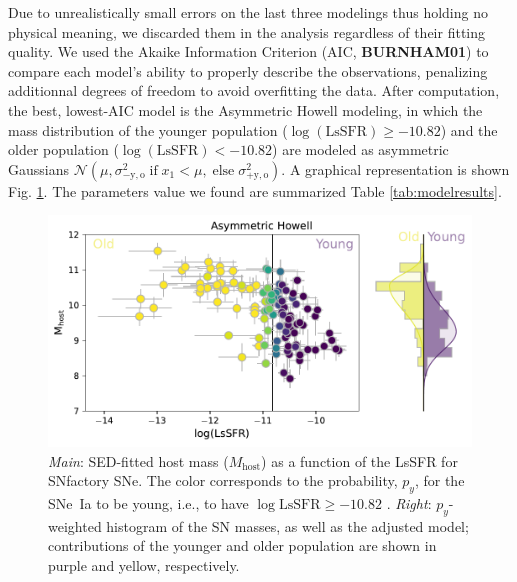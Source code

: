 \documentclass[]{aa}
\begin{document}
Due to unrealistically small errors on the last three modelings thus holding no
physical meaning, we discarded them in the analysis regardless of their fitting
quality. We used the Akaike Information Criterion (AIC, \textbf{BURNHAM01}) to
compare each model's ability to properly describe the observations, penalizing
additionnal degrees of freedom to avoid overfitting the data. After computation,
the best, lowest-AIC model is the Asymmetric Howell modeling, in which the mass
distribution of the younger population ($\log(\mathrm{LsSFR}) \geq -10.82$) and
the older population ($\log(\mathrm{LsSFR}) < -10.82$) are modeled as asymmetric
Gaussians $\mathcal{N}\left(\mu, \sigma_{-\mathrm{y,o}}^2\; \text{if}
\;x_1<\mu,\; \text{else} \;\sigma_{+\mathrm{y,o}}^2\right)$. A graphical
representation is shown Fig. \ref{fig:massmodel}. The parameters value we found
are summarized Table \ref{tab:modelresults}.

\begin{figure}[]
    \centering
    \includegraphics[width=\linewidth]{model_mass_2G2M4S_hist_SED-nonan.pdf}
    \caption{\textit{Main}: SED-fitted host mass ($M_\mathrm{host}$) as a
        function of the LsSFR for SNfactory SNe. The color corresponds to the
        probability, $p_y$, for the SNe~Ia to be young, i.e., to have
        $\log\mathrm{LsSFR} \geq -10.82$ \citep[see][]{rigault2020}.
    \textit{Right}: $p_y$-weighted histogram of the SN masses, as well as the
adjusted model; contributions of the younger and older population are shown in
purple and yellow, respectively.}
    \label{fig:massmodel}
\end{figure}
\end{document}
